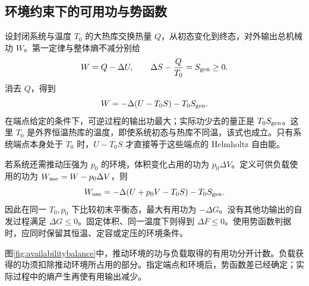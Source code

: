 \subsection{环境约束下的可用功与势函数}
\label{th:availabilityprinciple}
设封闭系统与温度 $T_0$ 的大热库交换热量 $Q$，从初态变化到终态，对外输出总机械功 $W$。第一定律与整体熵不减分别给
\[
 W=Q-\Delta U,\qquad
 \Delta S-\frac Q{T_0}=S_{\rm gen}\ge0.
\]
消去 $Q$，得到
\[
 W=-\Delta(U-T_0S)-T_0S_{\rm gen}.
\]
在端点给定的条件下，可逆过程的输出功最大；实际功少去的量正是 $T_0S_{\rm gen}$。这里 $T_0$ 是外界恒温热库的温度，即使系统初态与热库不同温，该式也成立。只有系统端点本身处于 $T_0$ 时，$U-T_0S$ 才直接等于这些端点的 Helmholtz 自由能。

若系统还需推动压强为 $p_0$ 的环境，体积变化占用的功为 $p_0\Delta V$。定义可供负载使用的功为 $W_{\rm use}=W-p_0\Delta V$，则
\[
 W_{\rm use}
 =-\Delta(U+p_0V-T_0S)-T_0S_{\rm gen}.
\]
因此在同一 $T_0,p_0$ 下比较初末平衡态，最大有用功为 $-\Delta G$。没有其他功输出的自发过程满足 $\Delta G\le0$。固定体积、同一温度下则得到 $\Delta F\le0$。使用势函数判据时，应同时保留其恒温、定容或定压的环境条件。

图\ref{fig:availabilitybalance}中，推动环境的功与负载取得的有用功分开计数。负载获得的功须扣除推动环境所占用的部分。指定端点和环境后，势函数差已经确定；实际过程中的熵产生再使有用输出减少。

